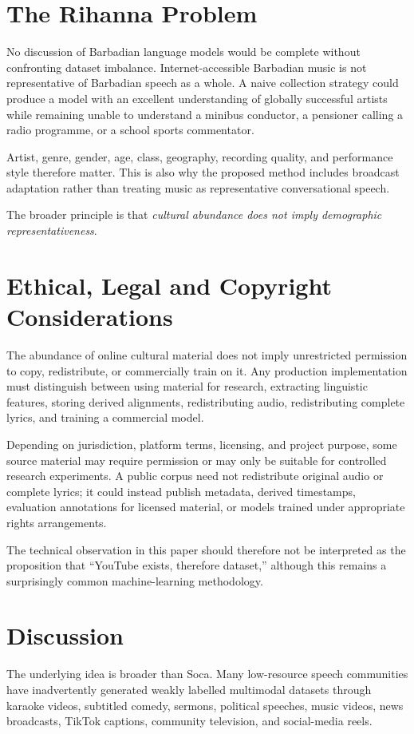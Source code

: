 \documentclass[10pt,twocolumn]{article}
\begin{document}
\section{The Rihanna Problem}
No discussion of Barbadian language models would be complete without confronting dataset imbalance. Internet-accessible Barbadian music is not representative of Barbadian speech as a whole. A naive collection strategy could produce a model with an excellent understanding of globally successful artists while remaining unable to understand a minibus conductor, a pensioner calling a radio programme, or a school sports commentator.

Artist, genre, gender, age, class, geography, recording quality, and performance style therefore matter. This is also why the proposed method includes broadcast adaptation rather than treating music as representative conversational speech.

The broader principle is that \emph{cultural abundance does not imply demographic representativeness}.

\section{Ethical, Legal and Copyright Considerations}
The abundance of online cultural material does not imply unrestricted permission to copy, redistribute, or commercially train on it. Any production implementation must distinguish between using material for research, extracting linguistic features, storing derived alignments, redistributing audio, redistributing complete lyrics, and training a commercial model.

Depending on jurisdiction, platform terms, licensing, and project purpose, some source material may require permission or may only be suitable for controlled research experiments. A public corpus need not redistribute original audio or complete lyrics; it could instead publish metadata, derived timestamps, evaluation annotations for licensed material, or models trained under appropriate rights arrangements.

The technical observation in this paper should therefore not be interpreted as the proposition that ``YouTube exists, therefore dataset,'' although this remains a surprisingly common machine-learning methodology.

\section{Discussion}
The underlying idea is broader than Soca. Many low-resource speech communities have inadvertently generated weakly labelled multimodal datasets through karaoke videos, subtitled comedy, sermons, political speeches, music videos, news broadcasts, TikTok captions, community television, and social-media reels.
\end{document}
